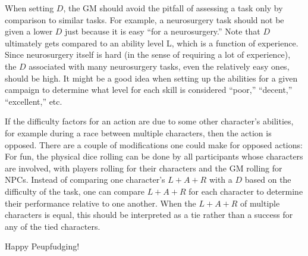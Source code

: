 When setting $D$, the GM should avoid the pitfall of assessing a task only by comparison to similar tasks.
For example, a neurosurgery task should not be given a lower $D$ just because it is easy “for a neurosurgery.” Note that $D$ ultimately gets compared to an ability level L, which is a function of experience.
Since neurosurgery itself is hard (in the sense of requiring a lot of experience), the $D$ associated with many neurosurgery tasks, even the relatively easy ones, should be high.
It might be a good idea when setting up the abilities for a given campaign to determine what level for each skill is considered “poor,” “decent,” “excellent,” etc.

If the difficulty factors for an action are due to some other character's abilities, for example during a race between multiple characters, then the action is opposed.
There are a couple of modifications one could make for opposed actions:
For fun, the physical dice rolling can be done by all participants whose characters are involved, with players rolling for their characters and the GM rolling for NPCs.
Instead of comparing one character’s $L + A + R$ with a $D$ based on the difficulty of the task, one can compare $L + A + R$ for each character to determine their performance relative to one another.
When the $L + A + R$ of multiple characters is equal, this should be interpreted as a tie rather than a success for any of the tied characters.

Happy Peupfudging!

